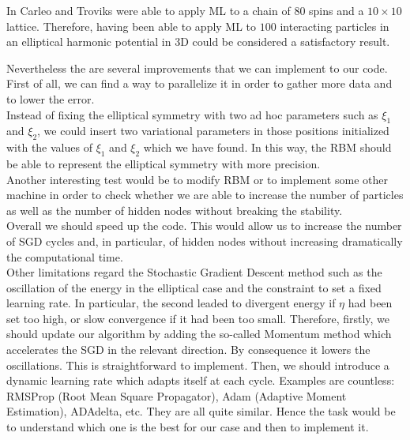 In \cite{carleoSolvingQuantumManybody2017} Carleo and Troviks were able to apply ML to a chain of $80$ spins and a $10\times 10$ lattice. Therefore, having been able to apply ML to $100$ interacting particles in an elliptical harmonic potential in 3D could be considered a satisfactory result.  


Nevertheless the are several improvements that we can implement to our code. First of all, we can find a way to parallelize it in order to gather more data and to lower the error. \\
Instead of fixing the elliptical symmetry with two ad hoc parameters such as $\xi_1$ and $\xi_2$, we could insert two variational parameters in those positions initialized with the values of $\xi_1$ and $\xi_2$ which we have found. In this way, the RBM should be able to represent the elliptical symmetry with more precision. \\
Another interesting test would be to modify RBM or to implement some other machine in order to check whether we are able to increase the number of particles as well as the number of hidden nodes without breaking the stability. \\
Overall we should speed up the code. This would allow us to increase the number of SGD cycles and, in particular, of hidden nodes without increasing dramatically the computational time.\\
Other limitations regard the Stochastic Gradient Descent method such as the oscillation of the energy in the elliptical case and the constraint to set a fixed learning rate. In particular, the second leaded to divergent energy if $\eta$ had been set too high, or slow convergence if it had been too small. Therefore, firstly, we should update our algorithm by adding the so-called Momentum method which accelerates the SGD in the relevant direction. By consequence it lowers the oscillations. This is straightforward to implement. Then, we should introduce a dynamic learning rate which adapts itself at each cycle. Examples are countless: RMSProp (Root Mean Square Propagator), Adam (Adaptive Moment Estimation), ADAdelta, etc. They are all quite similar. Hence the task would be to understand which one is the best for our case and then to implement it. 



